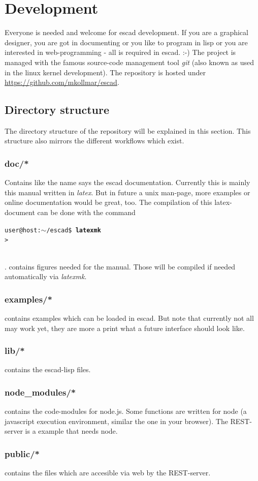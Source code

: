 \documentclass[a4paper, 12pt, openany]{scrbook}
\makeatletter
\newcommand{\shellcmdline}[2]{\\
  \setlength{\fboxsep}{2pt}\colorbox{black!20}{\parbox{\textwidth}{\texttt{user@host:$\sim$/escad\$ \textbf{#1}\\#2}}}\\}
\makeatother
\begin{document}
\chapter{Development}
Everyone is needed and welcome for escad development. If you are a graphical designer, you are got in documenting or you like to program in lisp or you are interested in web-programming - all is required in escad. :-)
The project is managed with the famous source-code management tool \emph{git} (also known as used in the linux kernel development). The repository is hosted under \url{https://github.com/mkollmar/escad}.
\section{Directory structure}
The directory structure of the repository will be explained in this section. This structure also mirrors the different workflows which exist.
\subsection{doc/*}
Contains like the name says the escad documentation. Currently this is mainly this manual written in \emph{latex}. But in future a unix man-page, more examples or online documentation would be great, too.
The compilation of this latex-document can be done with the command \shellcmdline{latexmk}{>}.  contains figures needed for the manual. Those will be compiled if needed automatically via \emph{latexmk}.
\subsection{examples/*}
 contains examples which can be loaded in escad. But note that currently not all may work yet, they are more a print what a future interface should look like.
\subsection{lib/*}
 contains the escad-lisp files.
\subsection{node\_modules/*}
 contains the code-modules for node.js. Some functions are written for node (a javascript execution environment, similar the one in your browser). The REST-server is a example that needs node.
\subsection{public/*}
 contains the files which are accesible via web by the REST-server.
\end{document}

